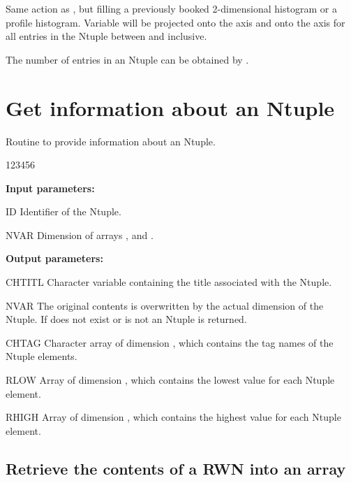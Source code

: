 
\Action
Same action as , but filling a previously
booked 2-dimensional histogram or a profile histogram.
Variable  will be projected onto the  axis and
 onto the  axis for all entries in the Ntuple
between  and  inclusive.

The number of entries in an Ntuple can be obtained by .


\section{Get information about an Ntuple}


\Action
Routine to provide information about an Ntuple.

\begin{DLttc}{123456}
\item[{\rm\bf Input parameters:}]
\item[ID] Identifier of the Ntuple.
\item[NVAR] Dimension of arrays , 
and .
\item[{\rm\bf Output parameters:}]
\item[CHTITL] Character
variable containing the title associated with the Ntuple.
\item[NVAR] The original contents is overwritten by the actual dimension of the
 Ntuple.
If  does not exist or is not an Ntuple  is returned.
\item[CHTAG] Character array of dimension , which
contains the tag names of the Ntuple elements.
\item[RLOW] Array of dimension , which
contains the lowest value for each Ntuple element.
\item[RHIGH] Array of dimension , which
contains the highest value for each Ntuple element.
\end{DLttc}

\subsection{Retrieve the contents of a RWN into an array}

